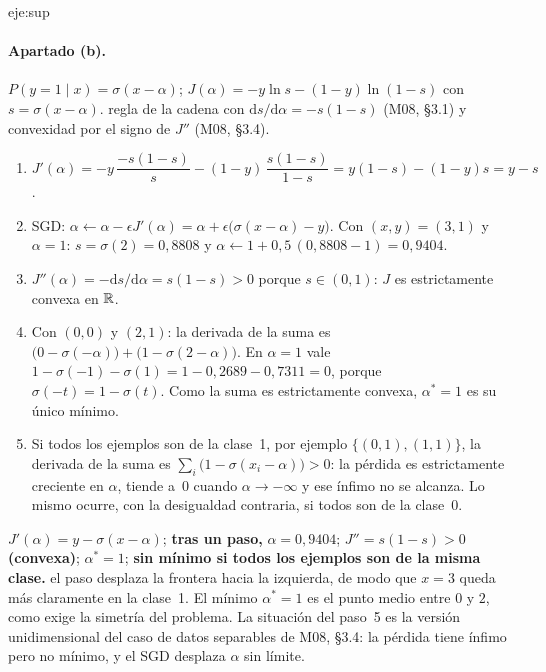 \begin{solucion}{eje:sup}
\paragraph{Apartado (b).}
\datos $P(y=1\mid x)=\sigma(x-\alpha)$; $J(\alpha)=-y\ln s-(1-y)\ln(1-s)$ con $s=\sigma(x-\alpha)$.
\planteamiento regla de la cadena con $\mathrm{d}s/\mathrm{d}\alpha=-s(1-s)$ (M08, §3.1) y convexidad por el signo de $J''$ (M08, §3.4).
\pasos
\begin{enumerate}[label=\arabic*.]
  \item $J'(\alpha)=-y\,\dfrac{-s(1-s)}{s}-(1-y)\,\dfrac{s(1-s)}{1-s}=y(1-s)-(1-y)s=y-s$.
  \item SGD: $\alpha\leftarrow\alpha-\epsilon J'(\alpha)=\alpha+\epsilon\bigl(\sigma(x-\alpha)-y\bigr)$. Con $(x,y)=(3,1)$ y $\alpha=1$: $s=\sigma(2)=0{,}8808$ y $\alpha\leftarrow 1+0{,}5\,(0{,}8808-1)=0{,}9404$.
  \item $J''(\alpha)=-\mathrm{d}s/\mathrm{d}\alpha=s(1-s)>0$ porque $s\in(0,1)$: $J$ es estrictamente convexa en $\mathbb{R}$.
  \item Con $(0,0)$ y $(2,1)$: la derivada de la suma es $\bigl(0-\sigma(-\alpha)\bigr)+\bigl(1-\sigma(2-\alpha)\bigr)$. En $\alpha=1$ vale $1-\sigma(-1)-\sigma(1)=1-0{,}2689-0{,}7311=0$, porque $\sigma(-t)=1-\sigma(t)$. Como la suma es estrictamente convexa, $\alpha^{*}=1$ es su único mínimo.
  \item Si todos los ejemplos son de la clase~1, por ejemplo $\{(0,1),(1,1)\}$, la derivada de la suma es $\sum_i\bigl(1-\sigma(x_i-\alpha)\bigr)>0$: la pérdida es estrictamente creciente en $\alpha$, tiende a~0 cuando $\alpha\to-\infty$ y ese ínfimo no se alcanza. Lo mismo ocurre, con la desigualdad contraria, si todos son de la clase~0.
\end{enumerate}
\resultado $J'(\alpha)=y-\sigma(x-\alpha)$; \textbf{tras un paso,} $\alpha=0{,}9404$; $J''=s(1-s)>0$ \textbf{(convexa)}; $\alpha^{*}=1$; \textbf{sin mínimo si todos los ejemplos son de la misma clase.}
\comprobacion el paso desplaza la frontera hacia la izquierda, de modo que $x=3$ queda más claramente en la clase~1. El mínimo $\alpha^{*}=1$ es el punto medio entre $0$ y $2$, como exige la simetría del problema. La situación del paso~5 es la versión unidimensional del caso de datos separables de M08, §3.4: la pérdida tiene ínfimo pero no mínimo, y el SGD desplaza $\alpha$ sin límite.


\end{solucion}
